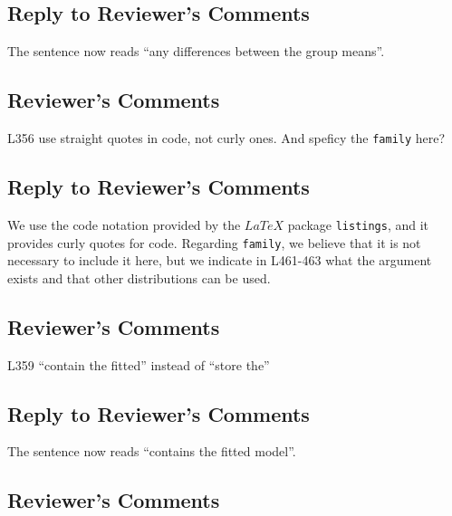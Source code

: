 \documentclass[
]{article}
\newcommand{\passthrough}[1]{#1}
\begin{document}
\hypertarget{section-26}{%
\subsection{\texorpdfstring{\textcolor{reviewersblue} {Reply to Reviewer's Comments}}{}}\label{section-26}}

The sentence now reads ``any differences between the group means''.

\hypertarget{reviewers-comments-26}{%
\subsection{Reviewer's Comments}\label{reviewers-comments-26}}

L356 use straight quotes in code, not curly ones. And speficy the \passthrough{\lstinline!family!} here?

\hypertarget{section-27}{%
\subsection{\texorpdfstring{\textcolor{reviewersblue} {Reply to Reviewer's Comments}}{}}\label{section-27}}

We use the code notation provided by the \(LaTeX\) package \passthrough{\lstinline!listings!}, and it provides curly quotes for code. Regarding \passthrough{\lstinline!family!}, we believe that it is not necessary to include it here, but we indicate in L461-463 what the argument exists and that other distributions can be used.

\hypertarget{reviewers-comments-27}{%
\subsection{Reviewer's Comments}\label{reviewers-comments-27}}

L359 ``contain the fitted'' instead of ``store the''

\hypertarget{section-28}{%
\subsection{\texorpdfstring{\textcolor{reviewersblue} {Reply to Reviewer's Comments}}{}}\label{section-28}}

The sentence now reads ``contains the fitted model''.

\hypertarget{reviewers-comments-28}{%
\subsection{Reviewer's Comments}\label{reviewers-comments-28}}
\end{document}
